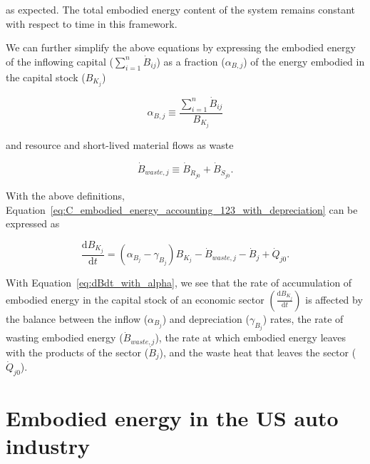 \noindent{}as expected. The total embodied energy content of the system 
remains constant with respect to time in this framework.

We can further simplify the above equations by expressing
the embodied energy of the inflowing capital ($\sum_{i=1}^{n} \dot{B}_{ij}$)
as a fraction ($\alpha_{B,j}$) of the energy embodied in the capital stock ($B_{K_{j}}$)

\begin{equation}
	\alpha_{B,j}
	\equiv \frac{\sum\limits_{i=1}^n\dot{B}_{ij}}{B_{K_{j}}}
\end{equation}

\noindent{}and resource and short-lived material flows as waste

\begin{equation}
	\dot{B}_{waste,j}
	\equiv \dot{B}_{\dot{R}_{j0}}
	+ \dot{B}_{\dot{S}_{j0}}.
\end{equation}

\noindent{}With the above definitions, 
Equation~\ref{eq:C_embodied_energy_accounting_123_with_depreciation}
can be expressed as

\begin{equation} \label{eq:dBdt_with_alpha}
	\frac{\mathrm{d}B_{K_{j}}}{\mathrm{d}t} 
	= (\alpha_{B_{j}} - \gamma_{B_{j}}) B_{K_{j}}
	- \dot{B}_{waste,j} 
	- \dot{B}_{j}
	+ \dot{Q}_{j0}.
\end{equation}

With Equation~\ref{eq:dBdt_with_alpha}, we see that
the rate of accumulation of embodied energy
in the capital stock of an economic sector
$\left( \frac{\mathrm{d}B_{K_{j}}}{\mathrm{d}t} \right)$
is affected by the balance between the inflow ($\alpha_{B_{j}}$) 
and depreciation ($\gamma_{B_{j}}$) rates, the rate of wasting
embodied energy ($\dot{B}_{waste,j}$), 
the rate at which embodied energy leaves with the products 
of the sector ($\dot{B}_{j}$), 
and the waste heat that leaves the sector ($\dot{Q}_{j0}$).


\section{Embodied energy in the US auto industry}
\label{sec:embodied_energy_auto}

